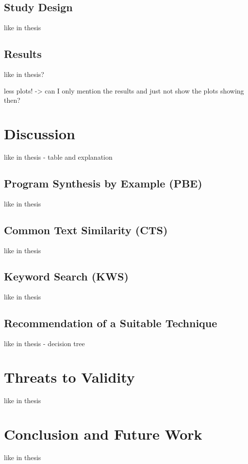\subsection{Study Design}
like in thesis
\subsection{Results}
like in thesis?

less plots! -> can I only mention the results and just not show the plots showing then?

\section{Discussion}
like in thesis - table and explanation
\subsection{Program Synthesis by Example (PBE)}
like in thesis
\subsection{Common Text Similarity (CTS)}
like in thesis
\subsection{Keyword Search (KWS)}
like in thesis
\subsection{Recommendation of a Suitable Technique}
like in thesis - decision tree

\section{Threats to Validity}
like in thesis

\section{Conclusion and Future Work}
like in thesis

